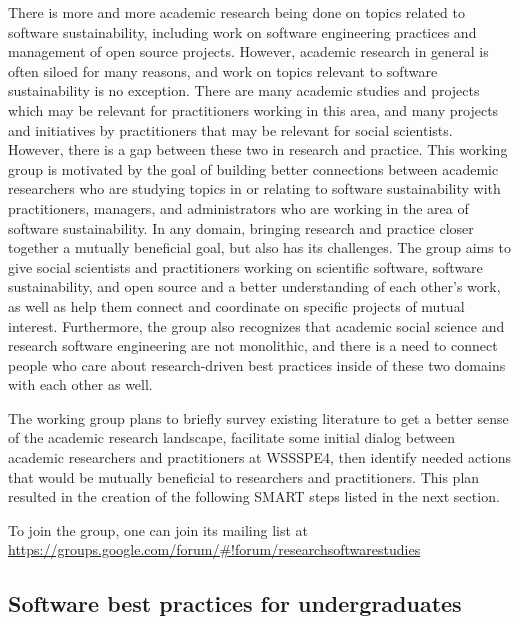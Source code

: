 \documentclass[11pt, oneside]{amsart}
\newcommand{\note}[1]{ {\textcolor{blueish}    { ***Note:      #1 }}}
\begin{document}




There is more and more academic research being done on topics related to software sustainability, including work on software engineering practices and management of open source projects. However, academic research in general is often siloed for many reasons, and work on topics relevant to software sustainability is no exception. There are many academic studies and projects which may be relevant for practitioners working in this area, and many projects and initiatives by practitioners that may be relevant for social scientists. However, there is a gap between these two in research and practice.
%
This working group is motivated by the goal of building better connections between academic researchers who are studying topics in or relating to software sustainability with practitioners, managers, and administrators who are working in the area of software sustainability.
%
 In any domain, bringing research and practice closer together a mutually beneficial goal, but also has its challenges.
The group aims to give social scientists and practitioners working on scientific software, software sustainability, and open source and a better understanding of each other's work, as well as help them connect and coordinate on specific projects of mutual interest.
%
Furthermore, the group also recognizes that academic social science and research software engineering are not monolithic, and there is a need to connect people who care about research-driven best practices inside of these two domains with each other as well.

The working group plans to briefly survey existing literature to get a better sense of the academic research landscape, facilitate some initial dialog between academic researchers and practitioners at WSSSPE4, then identify needed actions that would be mutually beneficial to researchers and practitioners. This plan resulted in the creation of the following SMART steps listed in the next section.


To join the group, one can join its mailing list at \url{https://groups.google.com/forum/#!forum/researchsoftwarestudies}


\subsection{Software best practices for undergraduates}
\label{sec:best-practices-undergrads}
\end{document}
